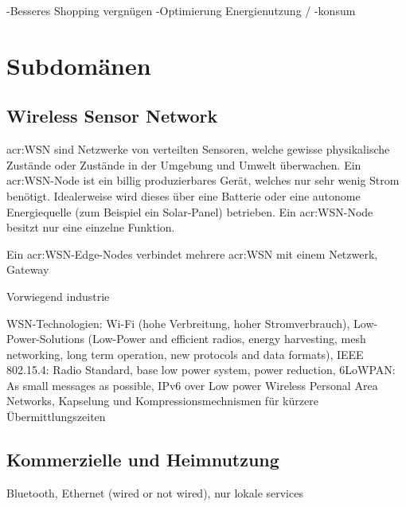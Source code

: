 -Besseres Shopping vergnügen
-Optimierung Energienutzung / -konsum

\section{Subdomänen}
\subsection{Wireless Sensor Network}
\gls{acr:WSN} sind Netzwerke von verteilten Sensoren, welche gewisse physikalische Zustände oder Zustände in der Umgebung und Umwelt überwachen. Ein \gls{acr:WSN}-Node ist ein billig produzierbares Gerät, welches nur sehr wenig Strom benötigt. Idealerweise wird dieses über eine Batterie oder eine autonome Energiequelle (zum Beispiel ein Solar-Panel) betrieben. Ein \gls{acr:WSN}-Node besitzt nur eine einzelne Funktion.

Ein \gls{acr:WSN}-Edge-Nodes verbindet mehrere \gls{acr:WSN} mit einem Netzwerk, Gateway

Vorwiegend industrie

WSN-Technologien: Wi-Fi (hohe Verbreitung, hoher Stromverbrauch), Low-Power-Solutions (Low-Power and efficient radios, energy harvesting, mesh networking, long term operation, new protocols and data formats), IEEE 802.15.4: Radio Standard, base low power system, power reduction, 6LoWPAN: As small messages as possible, IPv6 over Low power Wireless Personal Area Networks, Kapselung und Kompressionsmechnismen für kürzere Übermittlungszeiten

\subsection{Kommerzielle und Heimnutzung}
Bluetooth, Ethernet (wired or not wired), nur lokale services











































